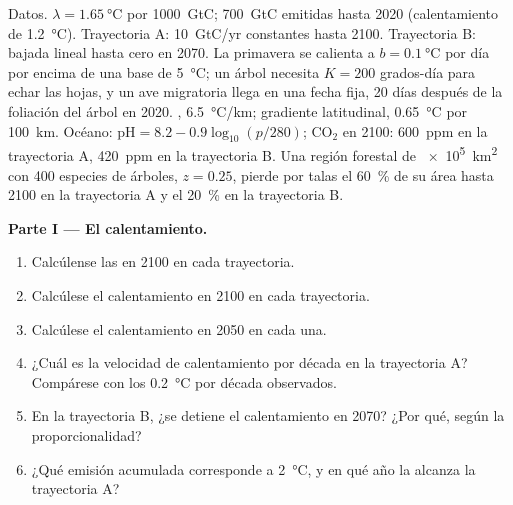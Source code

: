 \begin{problem}
\label{pb:b2:global-change:1}
Datos. $\lambda = \qty{1.65}{\celsius}$ por \qty{1000}{GtC};
\qty{700}{GtC} emitidas hasta 2020 (calentamiento de \qty{1.2}{\celsius}).
Trayectoria A: \qty{10}{GtC/yr} constantes hasta 2100. Trayectoria B:
bajada lineal hasta cero en 2070. La primavera se calienta a
$b = \qty{0.1}{\celsius}$ por día por encima de una base de
\qty{5}{\celsius}; un árbol necesita $K = 200$ grados-día para echar las
hojas, y un ave migratoria llega en una fecha fija, 20 días después de la
foliación del árbol en 2020. ,
\qty{6.5}{\celsius/km}; gradiente latitudinal, \qty{0.65}{\celsius} por
\qty{100}{km}. Océano: $\mathrm{pH} = 8.2 - 0.9\log_{10}(p/280)$;
\ensuremath{\mathrm{CO_2}} en 2100: \qty{600}{ppm} en la trayectoria A, \qty{420}{ppm}
en la trayectoria B. Una región forestal de \qty{e5}{km^2} con 400
especies de árboles, $z = 0.25$, pierde por talas el \qty{60}{\%} de su
área hasta 2100 en la trayectoria A y el \qty{20}{\%} en la trayectoria B.

\medskip
\noindent\textbf{Parte I --- El calentamiento.}
\begin{enumerate}
  \item Calcúlense las  en 2100 en cada trayectoria.
  \item Calcúlese el calentamiento en 2100 en cada trayectoria.
  \item Calcúlese el calentamiento en 2050 en cada una.
  \item ¿Cuál es la velocidad de calentamiento por década en la
        trayectoria A? Compárese con los \qty{0.2}{\celsius} por década
        observados.
  \item En la trayectoria B, ¿se detiene el calentamiento en 2070? ¿Por
        qué, según la proporcionalidad?
  \item ¿Qué emisión acumulada corresponde a \qty{2}{\celsius}, y en qué
        año la alcanza la trayectoria A?
\end{enumerate}


\end{problem}

